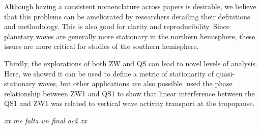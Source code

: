 \documentclass[draft,linenumbers]{agujournal2018}
\begin{document}
Although having a consistent nomenclature across papers is desirable, we
believe that this problems can be ameliorated by researchers detailing
their definitions and methodology. This is also good for clarity and
reproducibility. Since planetary waves are generally more stationary in
the northern hemisphere, these issues are more critical for studies of
the southern hemisphere.

Thirdly, the explorations of both ZW and QS can lead to novel levels of
analysis. Here, we showed it can be used to define a metric of
stationarity of quasi-stationary waves, but other applications are also
possible. \citet{Smith2012} used the phase relationship between ZW1 and
QS1 to show that linear interference between the QS1 and ZW1 was related
to vertical wave activity transport at the tropopause.

\emph{xx me falta un final acá xx}


\end{document}
